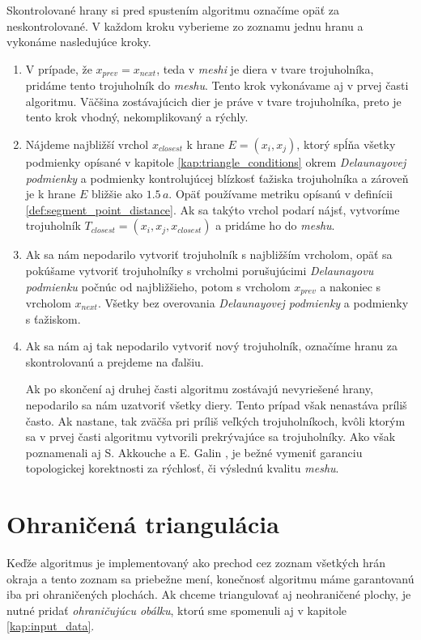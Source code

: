 Skontrolované hrany si pred spustením algoritmu označíme opäť za neskontrolované. V každom kroku vyberieme
zo zoznamu jednu hranu a vykonáme nasledujúce kroky.
\begin{enumerate}
    \item{
        V prípade, že $x_{prev} = x_{next}$, teda v \textit{meshi} je diera v tvare trojuholníka, pridáme tento 
        trojuholník do \textit{meshu}. Tento krok vykonávame aj v prvej časti algoritmu. Väčšina zostávajúcich
        dier je práve v tvare trojuholníka, preto je tento krok vhodný, nekomplikovaný a rýchly.
    }
    \item{
        Nájdeme najbližší vrchol $x_{closest}$ k hrane $E = (x_i, x_j)$, ktorý spĺňa všetky podmienky 
        opísané v kapitole \ref{kap:triangle_conditions} okrem \textit{Delaunayovej podmienky} a podmienky 
        kontrolujúcej blízkosť ťažiska trojuholníka a zároveň je k hrane $E$ bližšie ako $1.5 \, a$. 
        Opäť používame metriku 
        opísanú v definícii \ref{def:segment_point_distance}. Ak sa takýto vrchol podarí nájsť, 
        vytvoríme trojuholník $T_{closest} = (x_i, x_j, x_{closest})$ a pridáme ho do \textit{meshu}.
    }
    \item{
        Ak sa nám nepodarilo vytvoriť trojuholník s najbližším vrcholom, opäť sa pokúšame vytvoriť 
        trojuholníky s vrcholmi porušujúcimi \textit{Delaunayovu podmienku} počnúc od najbližšieho, 
        potom s vrcholom $x_{prev}$
        a nakoniec s vrcholom $x_{next}$. Všetky bez overovania \textit{Delaunayovej podmienky} a 
        podmienky s ťažiskom.
    }
    \item{
        Ak sa nám aj tak nepodarilo vytvoriť nový trojuholník, označíme hranu za skontrolovanú a prejdeme
        na ďalšiu.
    }
    
    Ak po skončení aj druhej časti algoritmu zostávajú nevyriešené hrany, nepodarilo sa nám 
    uzatvoriť všetky diery. Tento prípad však nenastáva príliš často. Ak nastane, tak zväčša pri 
    príliš veľkých trojuholníkoch, kvôli ktorým sa v prvej časti algoritmu vytvorili prekrývajúce sa 
    trojuholníky. Ako však poznamenali aj S. Akkouche a E. Galin 
    \cite{akkouche2001adaptive}, je bežné vymeniť garanciu topologickej korektnosti za rýchlosť,
    či výslednú kvalitu \textit{meshu}. 
\end{enumerate}

\section{Ohraničená triangulácia}
\label{kap:bounded_triangulation}
Keďže algoritmus je implementovaný ako prechod cez zoznam všetkých hrán okraja a tento zoznam 
sa priebežne mení, konečnosť algoritmu máme garantovanú iba pri ohraničených plochách.
Ak chceme triangulovať aj neohraničené plochy, je nutné pridať \textit{ohraničujúcu obálku}, 
ktorú sme spomenuli aj v kapitole \ref{kap:input_data}.

